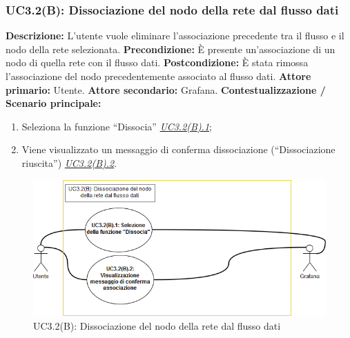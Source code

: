                 
                    
                \subsubsection{UC3.2(B): Dissociazione del nodo della rete dal flusso dati}
                    \textbf{Descrizione:} L’utente vuole eliminare l'associazione precedente tra il flusso e il nodo della rete selezionata.
                    \newline
                    \textbf{Precondizione:} \`E presente un'associazione di un nodo di quella rete con il flusso dati.
                    \newline
                    \textbf{Postcondizione:} \`E stata rimossa l'associazione del nodo precedentemente associato al flusso dati.
                    \newline
                    \textbf{Attore primario:} Utente.
                    \newline
                    \textbf{Attore secondario:} Grafana.
                    \newline
                    \textbf{Contestualizzazione / Scenario principale:} 
                    \begin{enumerate}
                        \item Seleziona la funzione “Dissocia” \underline{\textit{UC3.2(B).1}};
                        \item Viene visualizzato un messaggio di conferma dissociazione (“Dissociazione riuscita”) \underline{\textit{UC3.2(B).2}}.   
                    \end{enumerate}    
                
                \begin{figure}[!htbp]
                	\centering
                	\includegraphics[width=\textwidth]{UC3-2(B).png}
                	\caption{UC3.2(B): Dissociazione del nodo della rete dal flusso dati}
                	\label{uc3.2b}
                \end{figure}
                
